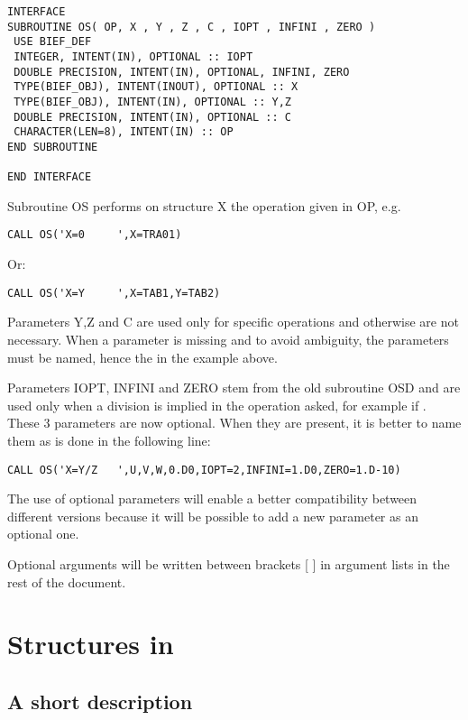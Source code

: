 \begin{lstlisting}[language=TelFortran]
INTERFACE
SUBROUTINE OS( OP, X , Y , Z , C , IOPT , INFINI , ZERO )
 USE BIEF_DEF
 INTEGER, INTENT(IN), OPTIONAL :: IOPT
 DOUBLE PRECISION, INTENT(IN), OPTIONAL, INFINI, ZERO
 TYPE(BIEF_OBJ), INTENT(INOUT), OPTIONAL :: X
 TYPE(BIEF_OBJ), INTENT(IN), OPTIONAL :: Y,Z
 DOUBLE PRECISION, INTENT(IN), OPTIONAL :: C
 CHARACTER(LEN=8), INTENT(IN) :: OP
END SUBROUTINE

END INTERFACE
\end{lstlisting}

Subroutine OS performs on structure X the operation given in OP, e.g.

\begin{lstlisting}[language=TelFortran]
CALL OS('X=0     ',X=TRA01)
\end{lstlisting}
Or:

\begin{lstlisting}[language=TelFortran]
CALL OS('X=Y     ',X=TAB1,Y=TAB2)
\end{lstlisting}
Parameters Y,Z and C are used only for specific operations and otherwise are
not necessary. When a parameter is missing and to avoid ambiguity, the
parameters must be named, hence the  in the example above.

Parameters IOPT, INFINI and ZERO stem from the old subroutine OSD and are used
only when a division is implied in the operation asked, for example if . These 3 parameters are now optional. When they are present, it is
better to name them as is done in the following line:

\begin{lstlisting}[language=TelFortran]
CALL OS('X=Y/Z   ',U,V,W,0.D0,IOPT=2,INFINI=1.D0,ZERO=1.D-10)
\end{lstlisting}

The use of optional parameters will enable a better compatibility between
different versions because it will be possible to add a new parameter as an
optional one.

Optional arguments will be written between brackets [ ] in argument lists in the
rest of the document.
%
\section{Structures in \bief}
%

\subsection{A short description}


